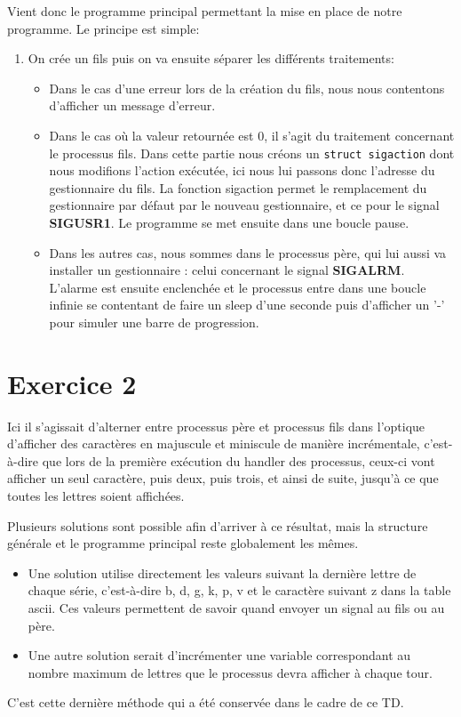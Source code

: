 Vient donc le programme principal permettant la mise en place de notre programme. Le principe est simple:
\begin{enumerate}
  \item On crée un fils puis on va ensuite séparer les différents traitements:
  \begin{itemize}
    \item Dans le cas d'une erreur lors de la création du fils, nous nous contentons d'afficher un message d'erreur.
    \item Dans le cas où la valeur retournée est 0, il s'agit du traitement concernant le processus fils. Dans cette partie nous créons un \lstinline{struct sigaction} dont nous modifions l'action exécutée, ici nous lui passons donc l'adresse du gestionnaire du fils. La fonction sigaction permet le remplacement du gestionnaire par défaut par le nouveau gestionnaire, et ce pour le signal \textbf{SIGUSR1}. Le programme se met ensuite dans une boucle pause.
    \item Dans les autres cas, nous sommes dans le processus père, qui lui aussi
va installer un gestionnaire : celui concernant le signal \textbf{SIGALRM}. L'alarme est ensuite
enclenchée et le processus entre dans une boucle infinie se contentant de faire un sleep d'une seconde
puis d'afficher un '-' pour simuler une barre de progression.
  \end{itemize}
\end{enumerate}

\section{Exercice 2}
Ici il s'agissait d'alterner entre processus père et processus fils dans l'optique d'afficher des caractères en majuscule et miniscule de manière \og{}incrémentale\fg{}, c'est-à-dire que lors de la première exécution du handler des processus, ceux-ci vont afficher un seul caractère, puis deux, puis trois, et ainsi de suite, jusqu'à ce que toutes les lettres soient affichées.

\medskip

Plusieurs solutions sont possible afin d'arriver à ce résultat, mais la structure générale et le programme
principal reste globalement les mêmes.

\begin{itemize}
  \item Une solution utilise directement les valeurs suivant la dernière lettre de chaque série, c'est-à-dire b, d, g, k, p, v et le caractère suivant z dans la table ascii. Ces valeurs permettent de savoir quand envoyer un signal au fils ou au père.
  \item Une autre solution serait d'incrémenter une variable correspondant au nombre maximum de lettres que le processus devra afficher à \og{}chaque tour\fg{}.
\end{itemize}
C'est cette dernière méthode qui a été conservée dans le cadre de ce TD.

